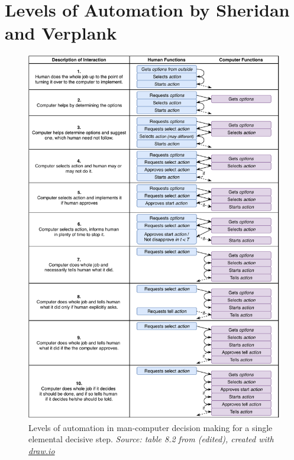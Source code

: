 
\chapter{Levels of Automation by Sheridan and Verplank} %

\label{AppendixA} %


\begin{figure}
    \centering
    \includegraphics[width=\textwidth]{Figures/draw.io/levels_of_automation_in_man-computer_decision_making_for_a_single_elemental_decisive_step}
    \decoRule
    \caption[Levels of automation in man-computer decision making for a single elemental decisive step]{Levels of automation in man-computer decision making for a single elemental decisive step. \textit{Source: table 8.2 from \cite{Sheridan1978} (edited), created with \href{https://www.draw.io/}{draw.io}}}
    \label{fig:levels_of_automation_in_man-computer_decision_making_for_a_single_elemental_decisive_step}
\end{figure}

